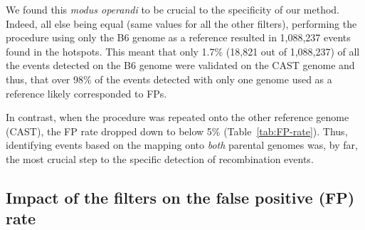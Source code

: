\begin{mccorrection}
We found this \textit{modus operandi} to be crucial to the specificity of our method.
Indeed, all else being equal (same values for all the other filters), performing the procedure using only the B6 genome as a reference resulted in 1,088,237 events found in the hotspots.
This meant that only 1.7\% (18,821 out of 1,088,237) of all the events detected on the B6 genome were validated on the CAST genome and thus, that over 98\% of the events detected with only one genome used as a reference likely corresponded to FPs.
\end{mccorrection}

In contrast, when the procedure was repeated onto the other reference genome (CAST), the FP rate dropped down to below 5\% (Table~\ref{tab:FP-rate}).
Thus, identifying events based on the mapping onto \textit{both} parental genomes was, by far, the most crucial step to the specific detection of recombination events.



\subsection{Impact of the filters on the false positive (FP) rate} 

